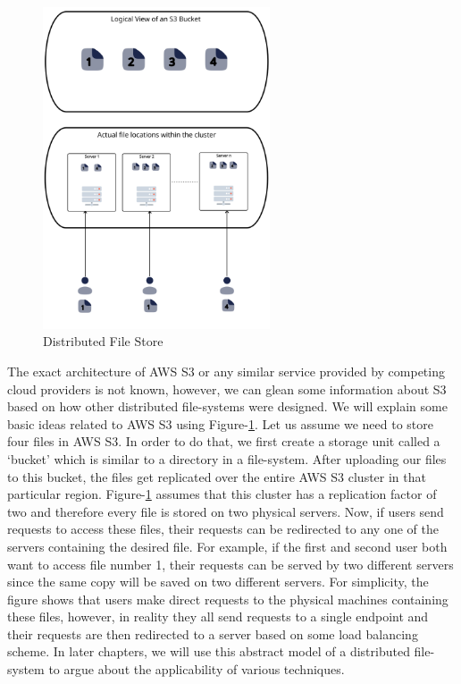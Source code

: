 \begin{figure}[ht]
    \centering
    \includegraphics[width=0.6\textwidth]{figures/distributedCloudStorage.png}
    \caption{Distributed File Store}
    \label{fig:distFileStore}
\end{figure}

\medskip
The exact architecture of AWS S3 or any similar service provided by
competing cloud providers is not known, however, we can glean some information
about S3 based on
how other distributed file-systems were designed. We will explain some basic ideas
related to AWS S3 using Figure-\ref{fig:distFileStore}. Let us assume we need to
store four files in AWS S3. In order to do that, we first create a storage unit
called a `bucket' which is similar to a directory in a file-system. After
uploading our files to this bucket, the files get replicated over the entire AWS S3 cluster in
that particular region. Figure-\ref{fig:distFileStore} assumes that this cluster
has a replication factor of two and therefore every file is stored on two
physical servers. Now, if users send requests to access these files, their
requests can be redirected to any one of the servers containing the desired file. For
example, if the first and second user both want to access file number 1, their
requests can be served by two different servers since the same copy will be
saved on two different servers. For simplicity, the figure shows that users make
direct requests to the physical machines containing these files, however, in
reality they all send requests to a single endpoint and their requests are then
redirected to a server based on some load balancing scheme. In later chapters,
we will use this abstract model of a distributed file-system to argue about the
applicability of various techniques.


